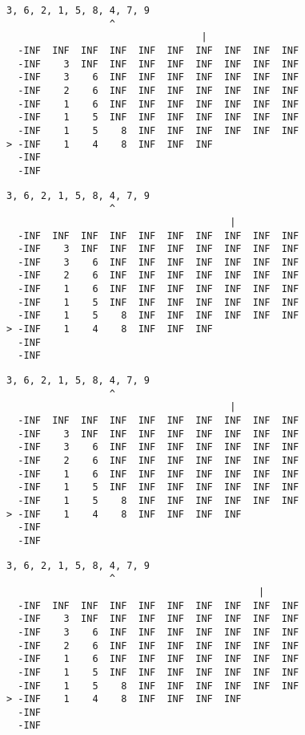 { \begin{verbatim}
3, 6, 2, 1, 5, 8, 4, 7, 9
                  ^
                                  |
  -INF  INF  INF  INF  INF  INF  INF  INF  INF  INF
  -INF    3  INF  INF  INF  INF  INF  INF  INF  INF
  -INF    3    6  INF  INF  INF  INF  INF  INF  INF
  -INF    2    6  INF  INF  INF  INF  INF  INF  INF
  -INF    1    6  INF  INF  INF  INF  INF  INF  INF
  -INF    1    5  INF  INF  INF  INF  INF  INF  INF
  -INF    1    5    8  INF  INF  INF  INF  INF  INF
> -INF    1    4    8  INF  INF  INF               
  -INF                                             
  -INF                                             
\end{verbatim} }

{ \begin{verbatim}
3, 6, 2, 1, 5, 8, 4, 7, 9
                  ^
                                       |
  -INF  INF  INF  INF  INF  INF  INF  INF  INF  INF
  -INF    3  INF  INF  INF  INF  INF  INF  INF  INF
  -INF    3    6  INF  INF  INF  INF  INF  INF  INF
  -INF    2    6  INF  INF  INF  INF  INF  INF  INF
  -INF    1    6  INF  INF  INF  INF  INF  INF  INF
  -INF    1    5  INF  INF  INF  INF  INF  INF  INF
  -INF    1    5    8  INF  INF  INF  INF  INF  INF
> -INF    1    4    8  INF  INF  INF               
  -INF                                             
  -INF                                             
\end{verbatim} }

{ \begin{verbatim}
3, 6, 2, 1, 5, 8, 4, 7, 9
                  ^
                                       |
  -INF  INF  INF  INF  INF  INF  INF  INF  INF  INF
  -INF    3  INF  INF  INF  INF  INF  INF  INF  INF
  -INF    3    6  INF  INF  INF  INF  INF  INF  INF
  -INF    2    6  INF  INF  INF  INF  INF  INF  INF
  -INF    1    6  INF  INF  INF  INF  INF  INF  INF
  -INF    1    5  INF  INF  INF  INF  INF  INF  INF
  -INF    1    5    8  INF  INF  INF  INF  INF  INF
> -INF    1    4    8  INF  INF  INF  INF          
  -INF                                             
  -INF                                             
\end{verbatim} }

{ \begin{verbatim}
3, 6, 2, 1, 5, 8, 4, 7, 9
                  ^
                                            |
  -INF  INF  INF  INF  INF  INF  INF  INF  INF  INF
  -INF    3  INF  INF  INF  INF  INF  INF  INF  INF
  -INF    3    6  INF  INF  INF  INF  INF  INF  INF
  -INF    2    6  INF  INF  INF  INF  INF  INF  INF
  -INF    1    6  INF  INF  INF  INF  INF  INF  INF
  -INF    1    5  INF  INF  INF  INF  INF  INF  INF
  -INF    1    5    8  INF  INF  INF  INF  INF  INF
> -INF    1    4    8  INF  INF  INF  INF          
  -INF                                             
  -INF                                             
\end{verbatim} }

